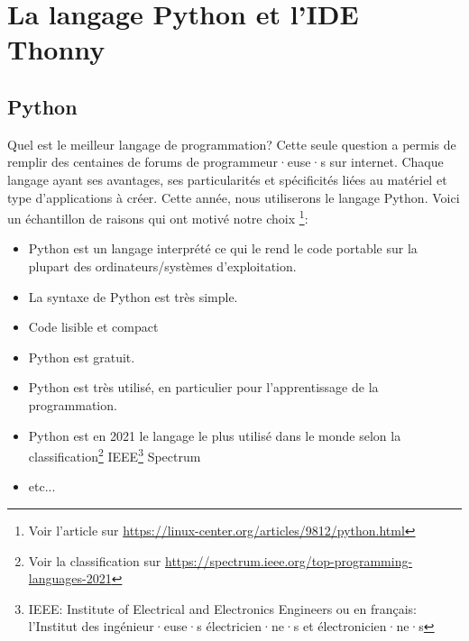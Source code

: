 \documentclass[11pt, a4paper]{book}
\begin{document}
\section{La langage Python et l'IDE Thonny}
\subsection{Python}
Quel est le meilleur langage de programmation? Cette seule question a permis de remplir des centaines de forums de programmeur·euse·s sur internet. Chaque langage ayant ses avantages, ses particularités et spécificités liées au matériel et type d'applications à créer. Cette année, nous utiliserons le langage Python. Voici un échantillon de raisons qui ont motivé notre choix \footnote{Voir l'article sur  \url{https://linux-center.org/articles/9812/python.html}}:
\begin{itemize}
	\item Python est un langage interprété ce qui le rend le code portable sur la plupart des ordinateurs/systèmes d'exploitation.
	\item La syntaxe de Python est très simple. 
	\item Code lisible et compact
	\item Python est gratuit.
	\item Python est très utilisé, en particulier pour l'apprentissage de la programmation.
	\item Python est en 2021 le langage le plus utilisé dans le monde selon la classification\footnote{Voir la classification sur \url{https://spectrum.ieee.org/top-programming-languages-2021}} IEEE\footnote{IEEE: Institute of Electrical and Electronics Engineers ou en français: l'Institut des ingénieur·euse·s électricien·ne·s et électronicien·ne·s} Spectrum 
	\item etc...
\end{itemize}
\end{document}
